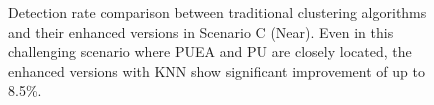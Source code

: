 \begin{figure}[htbp]
    \caption{Detection rate comparison between traditional clustering algorithms and their enhanced versions in Scenario C (Near). Even in this challenging scenario where PUEA and PU are closely located, the enhanced versions with KNN show significant improvement of up to 8.5\%.}
    \label{fig:detection_comparison_C_enhanced}
\end{figure}
